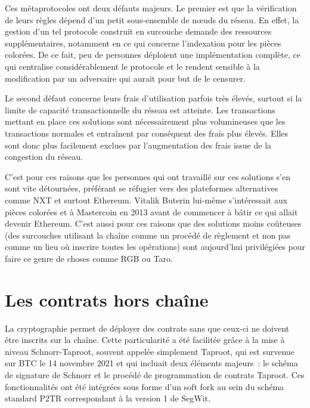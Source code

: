 Ces métaprotocoles ont deux défauts majeurs. Le premier est que la vérification de leurs règles dépend d'un petit sous-ensemble de nœuds du réseau. En effet, la gestion d'un tel protocole construit en surcouche demande des ressources supplémentaires, notamment en ce qui concerne l'indexation pour les pièces colorées. De ce fait, peu de personnes déploient une implémentation complète, ce qui centralise considérablement le protocole et le rendent sensible à la modification par un adversaire qui aurait pour but de le censurer.

Le second défaut concerne leurs frais d'utilisation parfois très élevés, surtout si la limite de capacité transactionnelle du réseau est atteinte. Les transactions mettant en place ces solutions sont nécessairement plus volumineuses que les transactions normales et entraînent par conséquent des frais plus élevés. Elles sont donc plus facilement exclues par l'augmentation des frais issue de la congestion du réseau.

C'est pour ces raisons que les personnes qui ont travaillé sur ces solutions s'en sont vite détournées, préférant se réfugier vers des plateformes alternatives comme NXT et surtout Ethereum. Vitalik Buterin lui-même s'intéressait aux pièces colorées et à Mastercoin en 2013 avant de commencer à bâtir ce qui allait devenir Ethereum. C'est aussi pour ces raisons que des solutions moins coûteuses (des surcouches utilisant la chaîne comme un procédé de règlement et non pas comme un lieu où inscrire toutes les opérations) sont aujourd'hui privilégiées pour faire ce genre de choses comme RGB ou Taro.

\section*{Les contrats hors chaîne} %

La cryptographie permet de déployer des contrats sans que ceux-ci ne doivent être inscrits sur la chaîne. Cette particularité a été facilitée grâce à la mise à niveau Schnorr-Taproot, souvent appelée simplement Taproot, qui est survenue sur BTC le 14 novembre 2021 et qui incluait deux éléments majeurs~: le schéma de signature de Schnorr et le procédé de programmation de contrats Taproot. Ces fonctionnalités ont été intégrées sous forme d'un soft fork au sein du schéma standard P2TR correspondant à la version 1 de SegWit.

